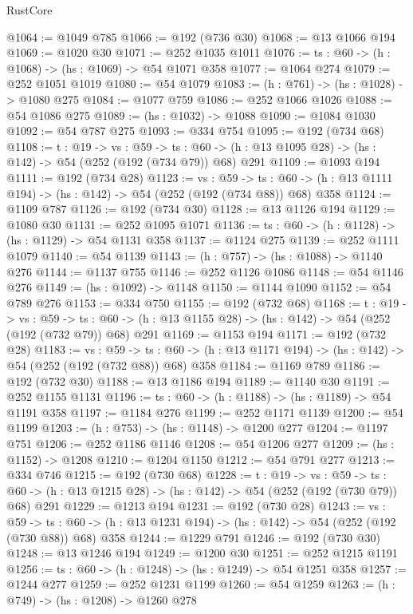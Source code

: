 \begin{lexlean}{RustCore}
\begin{coremodule}
@1064 := @1049 @785
@1066 := @192 (@736 @30)
@1068 := @13 @1066 @194
@1069 := @1020 @30
@1071 := @252 @1035 @1011
@1076 := {ts : @60} -> (h : @1068) -> (hs : @1069) -> @54 @1071 @358
@1077 := @1064 @274
@1079 := @252 @1051 @1019
@1080 := @54 @1079
@1083 := (h : @761) -> (hs : @1028) -> @1080 @275
@1084 := @1077 @759
@1086 := @252 @1066 @1026
@1088 := @54 @1086 @275
@1089 := (hs : @1032) -> @1088
@1090 := @1084 @1030
@1092 := @54 @787 @275
@1093 := @334 @754
@1095 := @192 (@734 @68)
@1108 := {t : @19} ->
  {vs : @59} ->
  {ts : @60} -> (h : @13 @1095 @28) -> (hs : @142) -> @54 (@252 (@192 (@734 @79)) @68) @291
@1109 := @1093 @194
@1111 := @192 (@734 @28)
@1123 := {vs : @59} ->
  {ts : @60} -> (h : @13 @1111 @194) -> (hs : @142) -> @54 (@252 (@192 (@734 @88)) @68) @358
@1124 := @1109 @787
@1126 := @192 (@734 @30)
@1128 := @13 @1126 @194
@1129 := @1080 @30
@1131 := @252 @1095 @1071
@1136 := {ts : @60} -> (h : @1128) -> (hs : @1129) -> @54 @1131 @358
@1137 := @1124 @275
@1139 := @252 @1111 @1079
@1140 := @54 @1139
@1143 := (h : @757) -> (hs : @1088) -> @1140 @276
@1144 := @1137 @755
@1146 := @252 @1126 @1086
@1148 := @54 @1146 @276
@1149 := (hs : @1092) -> @1148
@1150 := @1144 @1090
@1152 := @54 @789 @276
@1153 := @334 @750
@1155 := @192 (@732 @68)
@1168 := {t : @19} ->
  {vs : @59} ->
  {ts : @60} -> (h : @13 @1155 @28) -> (hs : @142) -> @54 (@252 (@192 (@732 @79)) @68) @291
@1169 := @1153 @194
@1171 := @192 (@732 @28)
@1183 := {vs : @59} ->
  {ts : @60} -> (h : @13 @1171 @194) -> (hs : @142) -> @54 (@252 (@192 (@732 @88)) @68) @358
@1184 := @1169 @789
@1186 := @192 (@732 @30)
@1188 := @13 @1186 @194
@1189 := @1140 @30
@1191 := @252 @1155 @1131
@1196 := {ts : @60} -> (h : @1188) -> (hs : @1189) -> @54 @1191 @358
@1197 := @1184 @276
@1199 := @252 @1171 @1139
@1200 := @54 @1199
@1203 := (h : @753) -> (hs : @1148) -> @1200 @277
@1204 := @1197 @751
@1206 := @252 @1186 @1146
@1208 := @54 @1206 @277
@1209 := (hs : @1152) -> @1208
@1210 := @1204 @1150
@1212 := @54 @791 @277
@1213 := @334 @746
@1215 := @192 (@730 @68)
@1228 := {t : @19} ->
  {vs : @59} ->
  {ts : @60} -> (h : @13 @1215 @28) -> (hs : @142) -> @54 (@252 (@192 (@730 @79)) @68) @291
@1229 := @1213 @194
@1231 := @192 (@730 @28)
@1243 := {vs : @59} ->
  {ts : @60} -> (h : @13 @1231 @194) -> (hs : @142) -> @54 (@252 (@192 (@730 @88)) @68) @358
@1244 := @1229 @791
@1246 := @192 (@730 @30)
@1248 := @13 @1246 @194
@1249 := @1200 @30
@1251 := @252 @1215 @1191
@1256 := {ts : @60} -> (h : @1248) -> (hs : @1249) -> @54 @1251 @358
@1257 := @1244 @277
@1259 := @252 @1231 @1199
@1260 := @54 @1259
@1263 := (h : @749) -> (hs : @1208) -> @1260 @278

\end{coremodule}
\end{lexlean}
